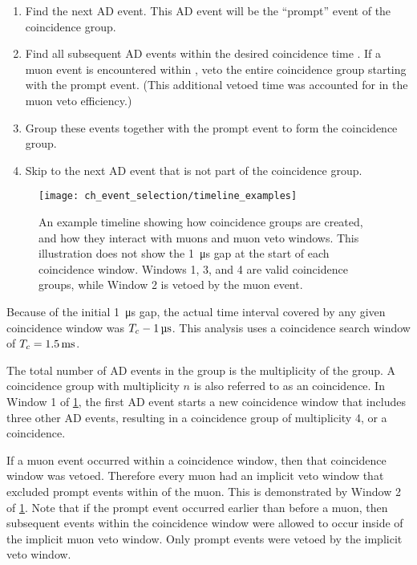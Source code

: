\begin{enumerate}
    \item Find the next AD event.
        This AD event will be the ``prompt'' event of the coincidence group.
    \item Find all subsequent AD events within the desired coincidence time \tc.
        If a muon event is encountered within \tc,
        veto the entire coincidence group starting with the prompt event.
        (This additional vetoed time was accounted for in the muon veto efficiency.)
    \item Group these events together with the prompt event
        to form the coincidence group.
    \item Skip to the next AD event that is not part of the coincidence group.
\end{enumerate}

\begin{figure}
    \centering
    \texttt{[image: ch\_event\_selection/timeline\_examples]}
    \caption[Coincidence groups diagram]{
        An example timeline showing how coincidence groups are created,
        and how they interact with muons and muon veto windows.
        This illustration does not show the \SI{1}{\micro\second} gap
        at the start of each coincidence window.
        Windows 1, 3, and 4 are valid coincidence groups,
        while Window 2 is vetoed by the muon event.
    }
    \label{fig:timeline_examples}
\end{figure}

Because of the initial \SI{1}{\micro\second} gap,
the actual time interval covered by any given coincidence window was
$T_c - \SI{1}{\micro\second}$.
This analysis uses a coincidence search window of $T_c = \SI{1.5}{\milli\second}$.

The total number of AD events in the group
is the multiplicity of the group.
A coincidence group with multiplicity $n$ is also referred to
as an  coincidence.
In Window 1 of \cref{fig:timeline_examples},
the first AD event starts a new coincidence window
that includes three other AD events,
resulting in a coincidence group of multiplicity 4, or a  coincidence.

If a muon event occurred within a coincidence window,
then that coincidence window was vetoed.
Therefore every muon had an implicit veto window
that excluded prompt events within \tc{} of the muon.
This is demonstrated by Window 2 of \cref{fig:timeline_examples}.
Note that if the prompt event occurred earlier than \tc{} before a muon,
then subsequent events within the coincidence window
were allowed to occur inside of the implicit muon veto window.
Only prompt events were vetoed by the implicit veto window.

